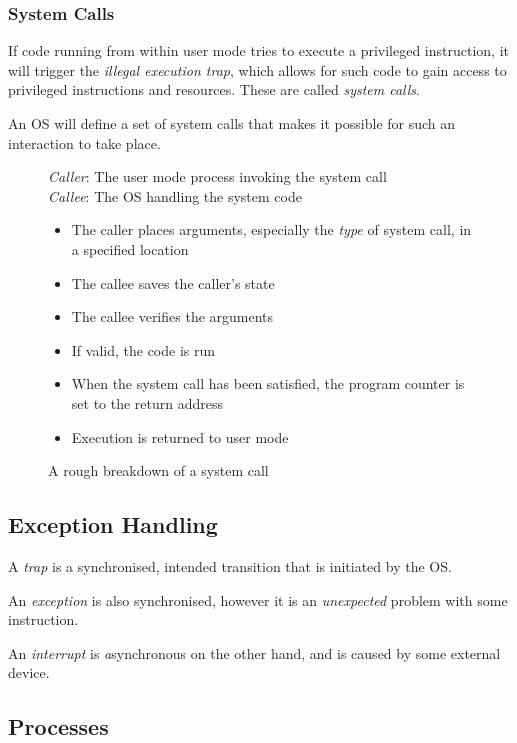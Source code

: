 \documentclass{article}
\begin{document}
\subsubsection{System Calls}

If code running from within user mode tries to execute a privileged instruction, it will trigger the \textit{illegal execution trap}, which allows for such code to gain access to privileged instructions and resources. These are called \textit{system calls}.

An OS will define a set of system calls that makes it possible for such an interaction to take place.

\begin{figure}[H]
  \begin{framed}
    \textit{Caller}: The user mode process invoking the system call\\
    \textit{Callee}: The OS handling the system code\\
    \begin{itemize}
    \item The caller places arguments, especially the \textit{type} of system call, in a specified location
    \item The callee saves the caller's state
    \item The callee verifies the arguments
    \item If valid, the code is run
    \item When the system call has been satisfied, the program counter is set to the return address
    \item Execution is returned to user mode
    \end{itemize}
  \end{framed}
  \caption{A rough breakdown of a system call}
\end{figure}

\subsection{Exception Handling}

A \textit{trap} is a synchronised, intended transition that is initiated by the OS.

An \textit{exception} is also synchronised, however it is an \textit{unexpected} problem with some instruction.

An \textit{interrupt} is \textit{a}synchronous on the other hand, and is caused by some external device.


\filbreak
\subsection{Processes}
\end{document}
